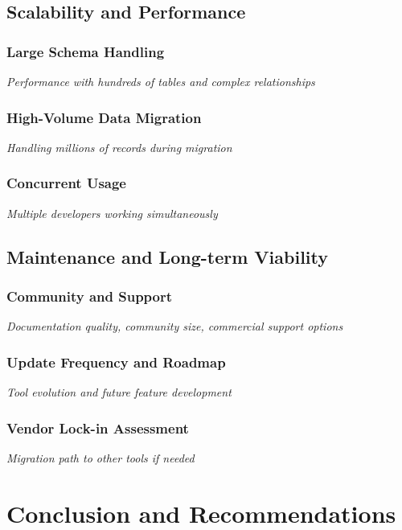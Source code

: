 \documentclass[11pt,a4paper]{article}
\begin{document}
\subsection{Scalability and Performance}

\subsubsection{Large Schema Handling}
\textit{Performance with hundreds of tables and complex relationships}

\subsubsection{High-Volume Data Migration}
\textit{Handling millions of records during migration}

\subsubsection{Concurrent Usage}
\textit{Multiple developers working simultaneously}

\subsection{Maintenance and Long-term Viability}

\subsubsection{Community and Support}
\textit{Documentation quality, community size, commercial support options}

\subsubsection{Update Frequency and Roadmap}
\textit{Tool evolution and future feature development}

\subsubsection{Vendor Lock-in Assessment}
\textit{Migration path to other tools if needed}

\section{Conclusion and Recommendations}
\end{document}
